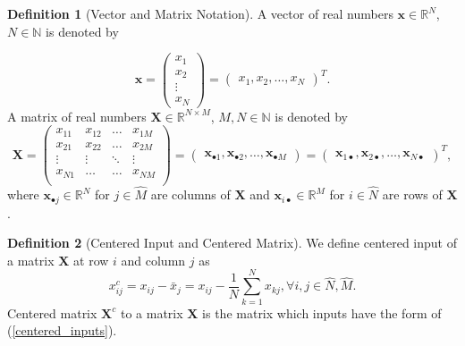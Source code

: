 \documentclass[11pt,oneside,czech,american]{book} %
\theoremstyle{definition} %
\theoremstyle{definition}
\newtheorem{defn}{Definition}
\begin{document}
\begin{defn}[Vector and Matrix Notation]
	A vector of real numbers $\bm{x} \in \mathbb{R}^N$, $N \in \mathbb{N}$ is denoted by
	
	\begin{equation}
		\bm{x}=\begin{pmatrix}
			x_1 \\
			x_2 \\
			\vdots \\
			x_N
			
			
		\end{pmatrix} = \begin{pmatrix}
			x_1, x_2, \dots, x_N
		\end{pmatrix}^T.
	\end{equation}
	A matrix of real numbers $\bm{X} \in \mathbb{R}^{N\times M}$, $M,N \in \mathbb{N}$ is denoted by
	\begin{equation}
		\bm{X}=\begin{pmatrix}
			x_{11} & x_{12} & \dots & x_{1M}\\
			x_{21} & x_{22} & \dots & x_{2M}\\
			\vdots & \vdots & \ddots & \vdots\\
			x_{N1} & \dots & \dots & x_{NM} \\
			
			
		\end{pmatrix} = \begin{pmatrix}
			\bm{x}_{\bullet 1}, \bm{x}_{\bullet 2}, \dots, \bm{x}_{\bullet M}
		\end{pmatrix} = \begin{pmatrix}
			\bm{x}_{1 \bullet}, \bm{x}_{2 \bullet}, \dots, \bm{x}_{N \bullet}
		\end{pmatrix}^T,
	\end{equation}
	where $\bm{x}_{\bullet j} \in \mathbb{R}^{N}$ for $j \in \hat{M}$ are columns of $\bm{X}$ and $\bm{x}_{ i \bullet} \in \mathbb{R}^{M}$ for $i \in \hat{N}$ are rows of $\bm{X}$.
	
\end{defn}

\begin{defn}[Centered Input and Centered Matrix]
	We define centered input of a matrix $\bm{X}$ at row $i$ and column $j$ as
	\begin{equation}
		x^{c}_{ij} = x_{ij} - \bar{x}_j = x_{ij} - \frac{1}{N} \sum_{k=1}^{N} x_{kj}, \forall i,j \in \hat{N}, \hat{M}.
		\label{centered_inputs}
	\end{equation}
	Centered matrix $\bm{X}^c$ to a matrix $\bm{X}$ is the matrix which inputs have the form of (\ref{centered_inputs}).
\end{defn}
\end{document}
